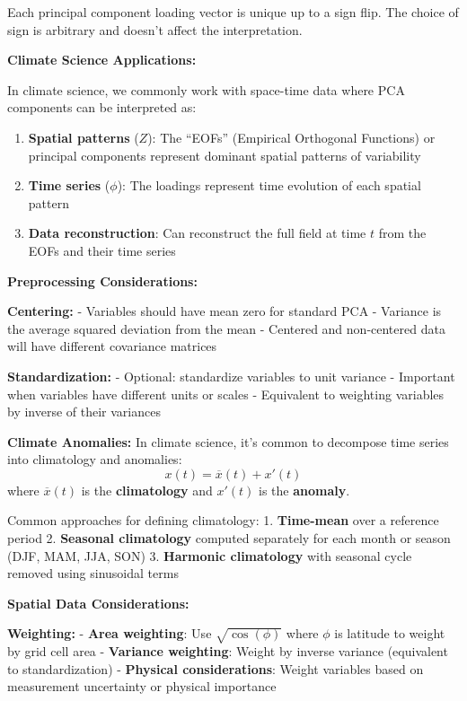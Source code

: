 \documentclass[
  letterpaper,
  DIV=11,
  numbers=noendperiod]{scrreprt}
\providecommand{\tightlist}{%
  \setlength{\itemsep}{0pt}\setlength{\parskip}{0pt}}
\begin{document}
Each principal component loading vector is unique up to a sign flip. The
choice of sign is arbitrary and doesn't affect the interpretation.

\textbf{Climate Science Applications:}

In climate science, we commonly work with space-time data where PCA
components can be interpreted as:

\begin{enumerate}
\def\labelenumi{\arabic{enumi}.}
\tightlist
\item
  \textbf{Spatial patterns} (\(Z\)): The ``EOFs'' (Empirical Orthogonal
  Functions) or principal components represent dominant spatial patterns
  of variability
\item
  \textbf{Time series} (\(\phi\)): The loadings represent time evolution
  of each spatial pattern
\item
  \textbf{Data reconstruction}: Can reconstruct the full field at time
  \(t\) from the EOFs and their time series
\end{enumerate}

\textbf{Preprocessing Considerations:}

\textbf{Centering:} - Variables should have mean zero for standard PCA -
Variance is the average squared deviation from the mean - Centered and
non-centered data will have different covariance matrices

\textbf{Standardization:} - Optional: standardize variables to unit
variance - Important when variables have different units or scales -
Equivalent to weighting variables by inverse of their variances

\textbf{Climate Anomalies:} In climate science, it's common to decompose
time series into climatology and anomalies:
\[x(t) = \overline{x}(t) + x'(t)\] where \(\overline{x}(t)\) is the
\textbf{climatology} and \(x'(t)\) is the \textbf{anomaly}.

Common approaches for defining climatology: 1. \textbf{Time-mean} over a
reference period 2. \textbf{Seasonal climatology} computed separately
for each month or season (DJF, MAM, JJA, SON) 3. \textbf{Harmonic
climatology} with seasonal cycle removed using sinusoidal terms

\textbf{Spatial Data Considerations:}

\textbf{Weighting:} - \textbf{Area weighting}: Use \(\sqrt{\cos(\phi)}\)
where \(\phi\) is latitude to weight by grid cell area -
\textbf{Variance weighting}: Weight by inverse variance (equivalent to
standardization) - \textbf{Physical considerations}: Weight variables
based on measurement uncertainty or physical importance
\end{document}
